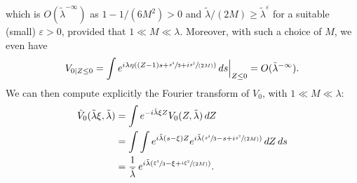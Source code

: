 \documentclass[11pt]{article}
\newcommand{\spfrac}[2]{\sfrac{#1}{(#2)}}
\theoremstyle{plain}
\theoremstyle{definition}
\begin{document}
which is $O(\tilde \lambda^{-\infty})$ as $1-1/(6M^{2})>0$ and $\tilde \lambda /(2M) \geq \tilde \lambda^{\varepsilon}$ for a suitable (small) $\varepsilon>0$, provided that $1\ll M\ll \lambda$. Moreover, with such a choice of $M$, we even have
\begin{equation}
\label{eq:Zneg}
V_{0|{Z}\leq 0}=\int e^{i\lambda \eta(({Z}-1) s+\sfrac {s^{3}} 3 +i \spfrac {s^{2}}{2M})} \,ds\Big|_{{Z}\leq 0}=O(\tilde \lambda^{-\infty}).
\end{equation}
We can then compute explicitly the Fourier transform of $V_0$, with $1\ll M\ll \lambda $:
\begin{equation}
\label{eq:55}
\begin{split}
\hat V_{0} (\tilde\lambda \xi,\tilde\lambda) & = \int e^{-i\tilde\lambda \xi {Z} }V_0({Z},\tilde\lambda)\,dZ \\
& =\int \int e^{i\tilde\lambda (s-\xi){Z}} e^{i\tilde\lambda (\sfrac {s^{3}} 3 -s +i \spfrac {s^{2}}{2M})} \,dZ \,ds \\
& =\frac 1 {\tilde\lambda}\, e^{i\tilde\lambda (\sfrac{\xi^{3}}3-\xi+\spfrac {i \xi^{2}}{2M})}.
\end{split}
\end{equation}
\end{document}
